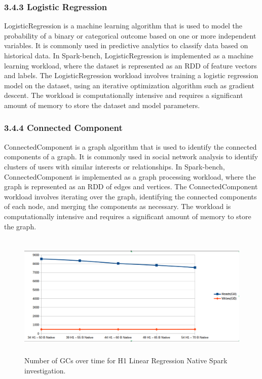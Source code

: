 \documentclass[twocolumn,10pt]{asme2e}
\begin{document}
\subsubsection*{3.4.3 Logistic Regression}
LogisticRegression is a machine learning algorithm that is used to model the probability of a binary or categorical outcome based on one or more independent variables. It is commonly used in predictive analytics to classify data based on historical data. In Spark-bench, LogisticRegression is implemented as a machine learning workload, where the dataset is represented as an RDD of feature vectors and labels.
The LogisticRegression workload involves training a logistic regression model on the dataset, using an iterative optimization algorithm such as gradient descent. The workload is computationally intensive and requires a significant amount of memory to store the dataset and model parameters.

\subsubsection*{3.4.4 Connected Component}
ConnectedComponent is a graph algorithm that is used to identify the connected components of a graph. It is commonly used in social network analysis to identify clusters of users with similar interests or relationships. In Spark-bench, ConnectedComponent is implemented as a graph processing workload, where the graph is represented as an RDD of edges and vertices.
The ConnectedComponent workload involves iterating over the graph, identifying the connected components of each node, and merging the components as necessary. The workload is computationally intensive and requires a significant amount of memory to store the graph.


\begin{figure}[h!]
        \includegraphics[width=12cm,height=6cm]{gcs_linr_h1_native.png}
	\caption{Number of GCs over time for H1 Linear Regression Native Spark investigation.}
	\label{fig:gcs_linr_h1_native}
\end{figure}
\end{document}
